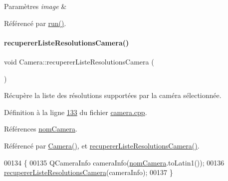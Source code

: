 \begin{DoxyParams}{Paramètres}
{\em image} & \\
\hline
\end{DoxyParams}


Référencé par \hyperlink{camera_8cpp_source_l00068}{run()}.

\mbox{\label{class_camera_a97267488c5756b4217d4e1fbc68008fd}} 
\paragraph{\texorpdfstring{recuperer\+Liste\+Resolutions\+Camera()}{recupererListeResolutionsCamera()}\hspace{0.1cm}{\footnotesize\ttfamily [1/4]}}
{\footnotesize\ttfamily void Camera\+::recuperer\+Liste\+Resolutions\+Camera (\begin{DoxyParamCaption}{ }\end{DoxyParamCaption})}



Récupère la liste des résolutions supportées par la caméra sélectionnée. 



Définition à la ligne \hyperlink{camera_8cpp_source_l00133}{133} du fichier \hyperlink{camera_8cpp_source}{camera.\+cpp}.



Références \hyperlink{camera_8h_source_l00063}{nom\+Camera}.



Référencé par \hyperlink{camera_8cpp_source_l00012}{Camera()}, et \hyperlink{camera_8cpp_source_l00139}{recuperer\+Liste\+Resolutions\+Camera()}.


\begin{DoxyCode}
00134 \{
00135     QCameraInfo cameraInfo(\hyperlink{class_camera_ac1cdaf82921d2a2f3f941d867718eba2}{nomCamera}.toLatin1());
00136     \hyperlink{class_camera_a97267488c5756b4217d4e1fbc68008fd}{recupererListeResolutionsCamera}(cameraInfo);
00137 \}
\end{DoxyCode}
\mbox{\label{class_camera_acf7554fa133bab58c16192041254a1d6}} 
